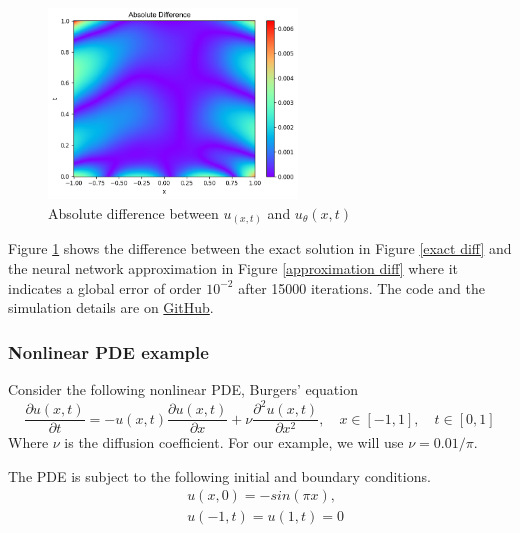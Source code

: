 \documentclass[a4paper,12pt]{article}
\theoremstyle{definition}
\begin{document}
\begin{figure}[H]
    \centering
    \includegraphics[width=250px]{images/difference_diff.png}
    \vspace{-1em}
    \caption{Absolute difference between $u_(x,t)$ and $u_\theta(x,t)$}
    \label{absolute diff}
\end{figure}

Figure \ref{absolute diff} shows the difference between the exact solution 
in Figure \ref{exact diff} and the neural network approximation in Figure \ref{approximation diff}
where it indicates a global error of order $10^{-2}$ after 15000 iterations. The code and the simulation
details are on \href{https://github.com/HashimAlSadah/MX-Project/blob/main/PINN/continuous_time_model/PDE_diffusion_PINN.ipynb}
{GitHub}.

\subsubsection{Nonlinear PDE example}
Consider the following nonlinear PDE, Burgers' equation
\begin{equation}
\frac{\partial u(x,t)}{\partial t} 
= -u(x,t)\frac{\partial u(x,t)}{\partial x} 
+ \nu \frac{\partial^2 u(x,t)}{\partial x^2}, \quad x \in [-1, 1], \quad t \in [0, 1]
\end{equation}
Where $\nu$ is the diffusion coefficient. For our example, we will use $\nu = 0.01 / \pi$.

The PDE is subject to the following initial and boundary conditions.
\begin{equation}
\begin{aligned}
&u(x, 0) = -sin(\pi x), \\
&u(-1, t) = u(1, t) = 0
\end{aligned}
\end{equation}
\end{document}
